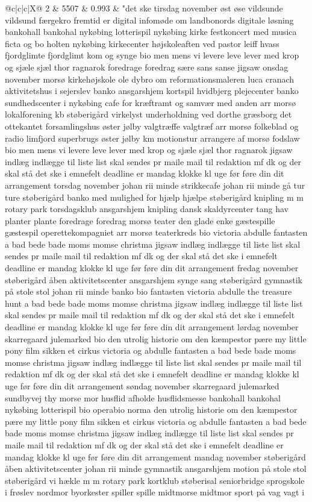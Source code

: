 \begin{xltabular}{\linewidth}{@{}c|c|c|X@{}}
		2 & 5507 & 0.993 & "det ske tirsdag november øst øse vildsunde vildsund færgekro fremtid er digital infomøde om landbonords digitale løsning bankohall bankohal nykøbing lotterispil nykøbing kirke festkoncert med musica ficta og bo holten nykøbing kirkecenter højskoleaften ved pastor leiff hvass fjordglimte fjordglimt kom og synge bio men mens vi levere leve lever med krop og sjæle sjæl thor ragnarok foredrage foredrag sære sans sanse jigsaw onsdag november morsø kirkehøjskole ole dybro om reformationsmaleren luca cranach aktivitetshus i sejerslev banko ansgarshjem kortspil hvidbjerg plejecenter banko sundhedscenter i nykøbing cafe for kræftramt og samvær med anden arr morsø lokalforening kb støberigård virkelyst underholdning ved dorthe græsborg det ottekantet forsamlingshus øster jølby valgtræffe valgtræf arr morsø folkeblad og radio limfjord superbrugs øster jølby km motionstur arrangere af morsø fodslaw bio men mens vi levere leve lever med krop og sjæle sjæl thor ragnarok jigsaw indlæg indlægge til liste list skal sendes pr maile mail til redaktion mf dk og der skal stå det ske i emnefelt deadline er mandag klokke kl uge før føre din dit arrangement torsdag november johan rii minde strikkecafe johan rii minde gå tur ture støberigård banko med mulighed for hjælp hjælpe støberigård knipling m m rotary park torsdagsklub ansgarshjem knipling dansk skaldyrcenter tang hav planter plante foredrage foredrag morsø teater den glade enke gæstespille gæstespil operettekompagniet arr morsø teaterkreds bio victoria abdulle fantasten a bad bede bade moms momse christma jigsaw indlæg indlægge til liste list skal sendes pr maile mail til redaktion mf dk og der skal stå det ske i emnefelt deadline er mandag klokke kl uge før føre din dit arrangement fredag november støberigård åben aktivitetscenter ansgarshjem synge sang støberigård gymnastik på stole stol johan rii minde banko bio fantasten victoria abdulle the treasure hunt a bad bede bade moms momse christma jigsaw indlæg indlægge til liste list skal sendes pr maile mail til redaktion mf dk og der skal stå det ske i emnefelt deadline er mandag klokke kl uge før føre din dit arrangement lørdag november skarregaard julemarked bio den utrolig historie om den kæmpestor pære my little pony film sikken et cirkus victoria og abdulle fantasten a bad bede bade moms momse christma jigsaw indlæg indlægge til liste list skal sendes pr maile mail til redaktion mf dk og der skal stå det ske i emnefelt deadline er mandag klokke kl uge før føre din dit arrangement søndag november skarregaard julemarked sundbyvej thy morse mor husflid afholde husflidsmesse bankohall bankohal nykøbing lotterispil bio operabio norma den utrolig historie om den kæmpestor pære my little pony film sikken et cirkus victoria og abdulle fantasten a bad bede bade moms momse christma jigsaw indlæg indlægge til liste list skal sendes pr maile mail til redaktion mf dk og der skal stå det ske i emnefelt deadline er mandag klokke kl uge før føre din dit arrangement mandag november støberigård åben aktivitetscenter johan rii minde gymnastik ansgarshjem motion på stole stol støberigård vi hækle m m rotary park kortklub støberisal seniorbridge sprogskole i frøslev nordmor byorkester spiller spille midtmorse midtmor sport på vag vagt i 
\end{xltabular}
